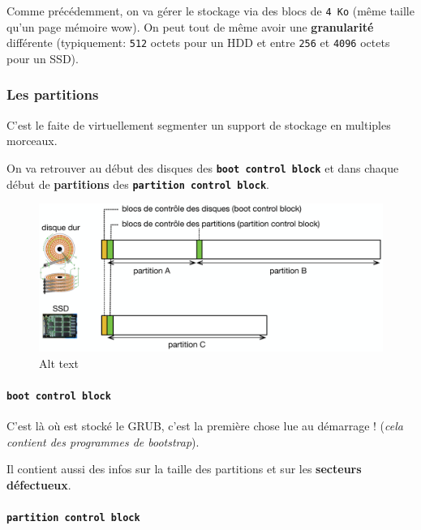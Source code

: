 Comme précédemment, on va gérer le stockage via des blocs de
\texttt{4\ Ko} (même taille qu'un page mémoire wow). On peut tout de
même avoir une \textbf{granularité} différente (typiquement:
\texttt{512} octets pour un HDD et entre \texttt{256} et \texttt{4096}
octets pour un SSD).

\subsubsection{Les partitions}\label{les-partitions}

C'est le faite de virtuellement segmenter un support de stockage en
multiples morceaux.

On va retrouver au début des disques des
\textbf{\texttt{boot\ control\ block}} et dans chaque début de
\textbf{partitions} des \textbf{\texttt{partition\ control\ block}}.

\begin{figure}
\centering
\includegraphics{image-39.png}
\caption{Alt text}
\end{figure}

\paragraph{\texorpdfstring{\texttt{boot\ control\ block}}{boot control block}}\label{boot-control-block}

C'est là où est stocké le GRUB, c'est la première chose lue au démarrage
! (\emph{cela contient des programmes de bootstrap}).

Il contient aussi des infos sur la taille des partitions et sur les
\textbf{secteurs défectueux}.

\paragraph{\texorpdfstring{\texttt{partition\ control\ block}}{partition control block}}\label{partition-control-block}

